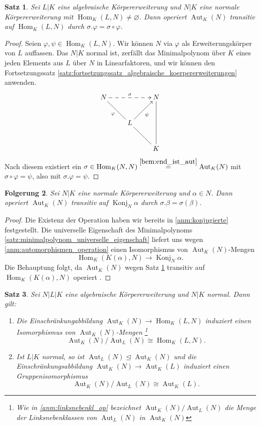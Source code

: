 \documentclass[a4paper, twoside, 11pt, ngerman]{report}
\DeclareMathOperator{\Aut}{Aut}
\DeclareMathOperator{\Hom}{Hom}
\DeclareMathOperator{\Konj}{Konj}
\theoremstyle{definistyle}
\newtheorem{satz}{Satz}[section]
\newtheorem{folgerung}[satz]{Folgerung}
\theoremstyle{remark}
\begin{document}
\begin{satz}\label{satz:trans_op_normale_Erw}
Sei $L|K$ eine algebraische Körpererweiterung und $N|K$ eine normale Körpererweiterung mit $\Hom_K(L,N)\neq\varnothing$.  
Dann operiert $\Aut_K(N)$ transitiv auf $\Hom_K(L,N)$ durch $\sigma.\varphi=\sigma\circ\varphi$.  
\end{satz}

\begin{proof}
Seien $\varphi, \psi \in \Hom_K(L,N)$. Wir können $N$ via $\varphi$ als Erweiterungskörper von $L$ auffassen.
Das $N|K$ normal ist, zerfällt das Minimalpolynom über $K$ eines jeden Elements aus $L$ über $N$ in Linearfaktoren,
und wir können den Fortsetzungssatz \ref{satz:fortsetzungssatz_algebraische_koerpererweiterungen} anwenden.
    \[
\xymatrix{
N \ar@{-}[dr]_\varphi \ar@{-->}[rr]^{\sigma} & & N \ar@{-}[dd] \\
 & L \ar[ur]_\psi \ar@{-}[dr] &  \\
 & & K
}
\]
Nach diesem existiert ein $\sigma \in \Hom_K(N,N)\overset{\ref{bem:end_ist_aut}}{=}\Aut_K(N)$ mit $\sigma \circ \varphi = \psi$, also mit $\sigma.\varphi=\psi$.
\end{proof}

\begin{folgerung}\label{folg:transitivity_on_roots}
Sei $N|K$ eine normale Körpererweiterung und $\alpha \in N$.  
Dann operiert $\Aut_K(N)$ transitiv auf $\Konj_N\alpha$ durch $\sigma.\beta=\sigma(\beta)$.
\end{folgerung}

\begin{proof}
Die Existenz der Operation haben wir bereits in \ref{anm:konjugierte} festgestellt.
Die universelle Eigenschaft des Minimalpolynoms \ref{satz:minimalpolynom_universelle_eigenschaft} liefert uns wegen
\ref{anm:automorphismen_operation} einen Isomorphismus von $\Aut_K(N)$-Mengen
\[
\Hom_K(K(\alpha),N) \to \Konj_N\alpha.
\]
Die Behauptung folgt, da $\Aut_K(N)$ wegen Satz \ref{satz:trans_op_normale_Erw} transitiv auf $\Hom_K(K(\alpha),N)$ operiert .
\end{proof}



\begin{satz}\label{satz:normale_erw_operation}
Sei $N|L|K$ eine algebraische Körpererweiterung und $N|K$ normal. Dann gilt:
\begin{enumerate}
\item[(a)] Die Einschränkungabbildung $\Aut_K(N) \to \Hom_K(L,N)$ induziert einen Isomorphismus von $\Aut_K(N)$-Mengen
\footnote{Wie in \ref{anm:linksnebenkl_op} bezeichnet $\Aut_K(N)/\Aut_L(N)$ die Menge der Linksnebenklassen von $\Aut_L(N)$ in $\Aut_K(N)$}
\[
\Aut_K(N)/\Aut_L(N) \cong \Hom_K(L,N).
\]
\item[(b)] Ist $L|K$ normal, so ist $\Aut_L(N) \trianglelefteq \Aut_K(N)$ und die Einschränkungsabbildung
$\Aut_K(N)\to\Aut_K(L)$ induziert einen Gruppenisomorphismus
\[
\Aut_K(N)/\Aut_L(N) \cong \Aut_K(L).
\]
\end{enumerate}
\end{satz}
\end{document}
